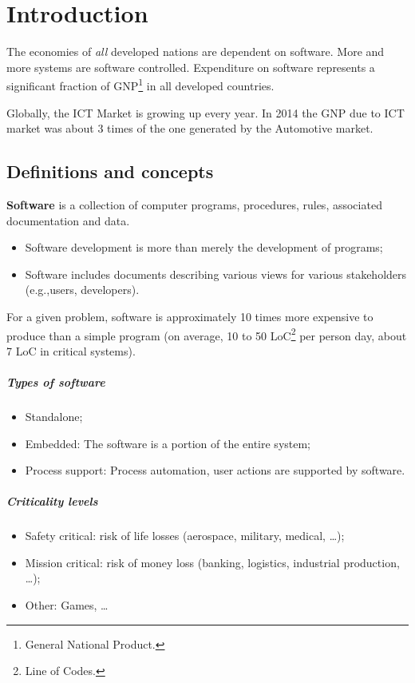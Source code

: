 \chapter{Introduction}
The economies of \textit{all} developed nations are dependent on software. More and more systems are software controlled. Expenditure on software represents a significant fraction of GNP\footnote{General National Product.} in all developed countries.

Globally, the ICT Market is growing up every year. In 2014 the GNP due to ICT market was about 3 times of the one generated by the Automotive market.

\section{Definitions and concepts}
\textbf{Software} is a collection of computer programs, procedures, rules, associated documentation and data.
\begin{itemize}
\item Software development is more than merely the development of programs;
\item Software includes documents describing various views for various stakeholders (e.g.,\@ users, developers).
\end{itemize}
For a given problem, software is approximately 10 times more expensive to produce than a simple program (on average, 10 to 50 LoC\footnote{Line of Codes.} per person day, about 7 LoC in critical systems).

\paragraph{Types of software}
\begin{itemize}
\item Standalone;
\item Embedded: The software is a portion of the entire system;
\item Process support: Process automation, user actions are supported by software.
\end{itemize}

\paragraph{Criticality levels}
\begin{itemize}
\item Safety critical: risk of life losses (aerospace, military, medical, \dots);
\item Mission critical: risk of money loss (banking, logistics, industrial production, \dots);
\item Other: Games, \dots
\end{itemize}

